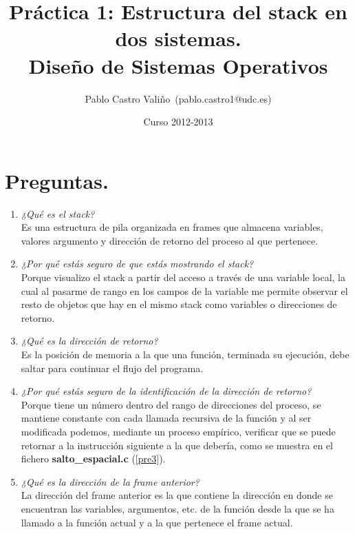 \documentclass[12pt,a4paper,titlepage]{article}
\title{\Huge{Práctica 1: Estructura del stack en dos sistemas.} \\ \normalsize{Diseño de Sistemas Operativos}}
\author{Pablo Castro Valiño~(pablo.castro1@udc.es)}
\date{Curso 2012-2013}
\begin{document}
	
	
\maketitle

\newpage

\tableofcontents

\newpage

\section{Preguntas.}

\begin{enumerate}
  \item \textit{¿Qué es el stack?}
  \\
Es una estructura de pila organizada en frames que almacena variables, valores argumento
y dirección de retorno del proceso al que pertenece.
  
  
  \item \textit{¿Por qué estás seguro de que estás mostrando el stack?}
  \\
Porque visualizo el stack a partir del acceso a través de una variable local, la cual al
pasarme de rango en los campos de la variable me permite observar el resto de objetos que
hay en el mismo stack como variables o direcciones de retorno.


  \item \textit{¿Qué es la dirección de retorno?}
  \\
Es la posición de memoria a la que una función, terminada su ejecución, debe saltar para 
continuar el flujo del programa.


  \item \textit{¿Por qué estás seguro de la identificación de la dirección de
retorno?}
  \\
Porque tiene un número dentro del rango de direcciones del proceso, se mantiene
constante con cada llamada recursiva de la función y al ser modificada podemos,
mediante un proceso empírico, verificar que se puede retornar a la instrucción
siguiente a la que debería, como se muestra en el fichero \textbf{salto\_espacial.c}
(\ref{pre3}).


  \item \textit{¿Qué es la dirección de la frame anterior?}
  \\
La dirección del frame anterior es la que contiene la dirección en donde se encuentran las
variables, argumentos, etc. de la función desde la que se ha llamado a la función actual y
a la que pertenece el frame actual.



\end{enumerate}
\end{document}
